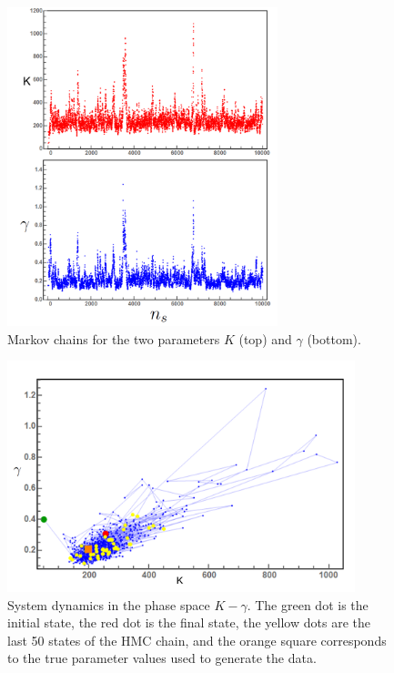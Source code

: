 \documentclass[11pt, a4paper]{article}
\begin{document}
\begin{figure}
    \centering
    \includegraphics[width=0.7\textwidth]{Figs/FigChains.png}
    \caption{Markov chains for the two parameters $K$ (top) and $\gamma$ (bottom).}
    \label{fig:chains}
\end{figure}

\begin{figure}
    \centering
    \includegraphics[width=0.9\textwidth]{Figs/FigPhaseSpaceEvol.png}
    \caption{System dynamics in the phase space $K-\gamma$. The green dot is the initial state, the red dot is the final state, the yellow dots are the last 50 states of the HMC chain, and the orange square corresponds to the true parameter values used to generate the data.}
    \label{fig:phase_space_evol}
\end{figure}
\end{document}
